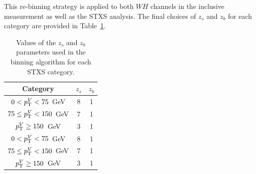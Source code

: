 This re-binning strategy is applied to both $WH$ channels in the inclusive measurement as well as the STXS analysis. The final choices of $z_{s}$ and $z_{b}$ for each category are provided in Table~\ref{tab:wh_zs_zb_parameters}.

\begin{table}[htp]
  \centering
  \begin{tabular}{c|c|c}
    \hline
    \textbf{Category} & \boldmath$z_{s}$ & \boldmath$z_{b}$ \\
    \hline\hline
    \zdom{} $0 < p_{\mathrm{T}}^{V}{} < 75$~GeV & 8 & 1 \\
    \zdom{} $75 \leq p_{\mathrm{T}}^{V}{} < 150$~GeV & 7 & 1 \\
    \zdom{} $p_{\mathrm{T}}^{V} \geq 150$~GeV & 3 & 1 \\
    \zdep{} $0 < p_{\mathrm{T}}^{V}{} < 75$~GeV & 8 & 1 \\
    \zdep{} $75 \leq p_{\mathrm{T}}^{V}{} < 150$~GeV & 7 & 1 \\
    \zdep{} $p_{\mathrm{T}}^{V} \geq 150$~GeV & 3 & 1 \\
    \hline
  \end{tabular}
  \caption{Values of the $z_{s}$ and $z_{b}$ parameters used in the binning algorithm for each \wh{} STXS category.}\label{tab:wh_zs_zb_parameters}
\end{table}
